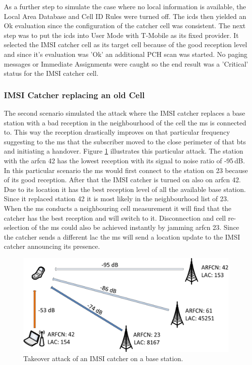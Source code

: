 As a further step to simulate the case where no local information is available, the Local Area Database and Cell ID Rules were turned off.
The \gls{icds} then yielded an Ok evaluation since the configuration of the catcher cell was consistent.
The next step was to put the \gls{icds} into User Mode with T-Mobile as its fixed provider. 
It selected the IMSI catcher cell as its target cell because of the good reception level and since it's evaluation was 'Ok' an additional PCH scan was started.
No paging messages or Immediate Assignments were caught so the end result was a 'Critical' status for the IMSI catcher cell.

\subsubsection{IMSI Catcher replacing an old Cell}
The second scenario simulated the attack where the IMSI catcher replaces a base station with a bad reception in the neighbourhood of the cell the \gls{ms} is connected to.
This way the reception drastically improves on that particular frequency suggesting to the \gls{ms} that the subscriber moved to the close perimeter of that \gls{bts} and initiating a handover.
Figure \ref{fig:takeover_attack} illustrates this particular attack.
The station with the \gls{arfcn} 42 has the lowest reception with its signal to noise ratio of -95\,dB.
In this particular scenario the \gls{ms} would first connect to the station on 23 because of its good reception.
After that the IMSI catcher is turned on also on \gls{arfcn} 42.
Due to its location it has the best reception level of all the available base station.
Since it replaced station 42 it is most likely in the neighbourhood list of 23.
When the \gls{ms} conducts a neighbouring cell measurement it will find that the catcher has the best reception and will switch to it.
Disconnection and cell re-selection of the \gls{ms} could also be achieved instantly by jamming \gls{arfcn} 23.
Since the catcher sends a different \gls{lac} the \gls{ms} will send a location update to the IMSI catcher announcing its presence.
\begin{figure}
\centering
\includegraphics{../Images/replace_attack}
\caption{Takeover attack of an IMSI catcher on a base station.}
\label{fig:takeover_attack}
\end{figure}

